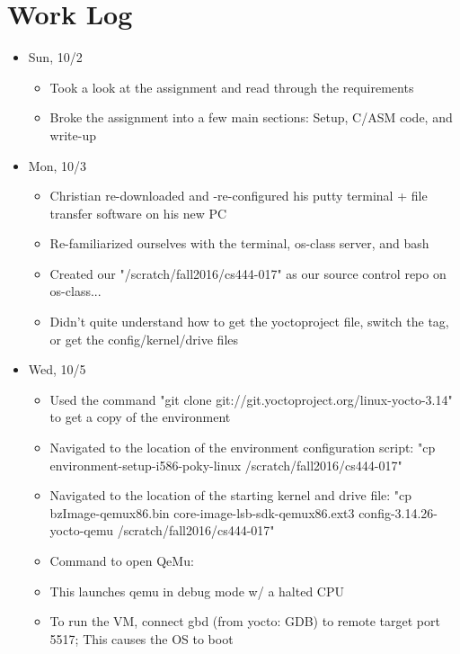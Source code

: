 \documentclass[letterpaper,10pt,onecolumn]{IEEEtran}
\begin{document}
    \vspace{7mm}
    
    \section*{Work Log}
    
    \begin{itemize}
    \item Sun, 10/2
        \begin{itemize} 
    	    \item Took a look at the assignment and read through the requirements	
    		\item Broke the assignment into a few main sections: Setup, C/ASM code, and write-up
    	\end{itemize}
    \item Mon, 10/3
        \begin{itemize} 
    		\item Christian re-downloaded and -re-configured his putty terminal + file transfer software on his new PC
    		\item Re-familiarized ourselves with the terminal, os-class server, and bash
    		\item Created our "/scratch/fall2016/cs444-017" as our source control repo on os-class...
    		\item Didn't quite understand how to get the yoctoproject file, switch the tag, or get the config/kernel/drive files
    	\end{itemize}
    \item Wed, 10/5
        \begin{itemize} 
    		\item Used the command "git clone git://git.yoctoproject.org/linux-yocto-3.14" to get a copy of the environment
    		\item Navigated to the location of the environment configuration script: "cp environment-setup-i586-poky-linux /scratch/fall2016/cs444-017"
    		\item Navigated to the location of the starting kernel and drive file: "cp bzImage-qemux86.bin core-image-lsb-sdk-qemux86.ext3 config-3.14.26-yocto-qemu /scratch/fall2016/cs444-017"
    		\item Command to open QeMu:
    		\item This launches qemu in debug mode w/ a halted CPU
    		\item To run the VM, connect gbd (from yocto: GDB) to remote target port 5517; This causes the OS to boot

\end{itemize}
\end{itemize}
\end{document}
